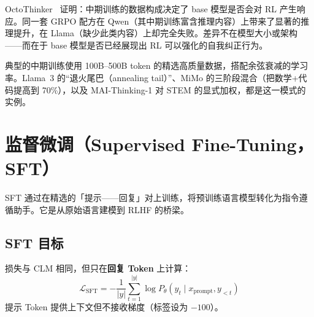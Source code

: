 \begin{warningbox}[中期训练决定 RL 就绪度]
OctoThinker~\cite{octothinker2025} 证明：中期训练的数据构成决定了 base 模型是否会对 RL 产生响应。同一套 GRPO 配方在 Qwen（其中期训练富含推理内容）上带来了显著的推理提升，在 Llama（缺少此类内容）上却完全失败。差异不在模型大小或架构——而在于 base 模型是否已经展现出 RL 可以强化的自我纠正行为。
\end{warningbox}

典型的中期训练使用 100B--500B token 的精选高质量数据，搭配余弦衰减的学习率。Llama~3 的“退火尾巴（annealing tail）”、MiMo 的三阶段混合（把数学+代码提高到 70\%），以及 MAI-Thinking-1 对 STEM 的显式加权，都是这一模式的实例。

\section{监督微调（Supervised Fine-Tuning，SFT）}
\label{sec:sft}

SFT 通过在精选的「提示——回复」对上训练，将预训练语言模型转化为指令遵循助手。它是从原始语言建模到 RLHF 的桥梁。

\subsection{SFT 目标}
\label{sft-objective}

损失与 CLM 相同，但只在\textbf{回复 Token} 上计算：
\[
\mathcal{L}_\text{SFT} = -\frac{1}{|y|}\sum_{t=1}^{|y|} \log P_\theta(y_t \mid x_\text{prompt}, y_{<t})
\]
提示 Token 提供上下文但不接收梯度（标签设为 $-100$）。

